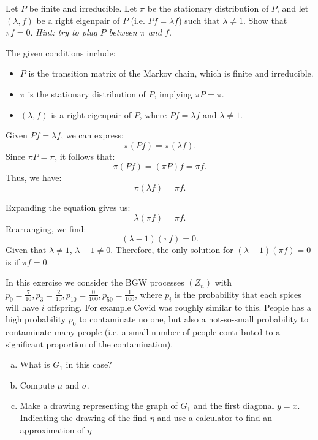 \begin{problem}
	Let $ P $ be finite and irreducible. Let $ \pi $ be the stationary distribution of $ P $, and let $ (\lambda,f) $ be a right eigenpair of $ P $ (i.e. $ Pf = \lambda f $) such that $ \lambda \neq 1 $. Show that $ \pi f= 0 $. \emph{Hint: try to plug $ P $ between $ \pi $ and $ f $.}
\end{problem}

\begin{solution}
	The given conditions include:
	\begin{itemize}
		\item $P$ is the transition matrix of the Markov chain, which is finite and irreducible.
		\item $\pi$ is the stationary distribution of $P$, implying $\pi P = \pi$.
		\item $(\lambda, f)$ is a right eigenpair of $P$, where $Pf = \lambda f$ and $\lambda \neq 1$.
	\end{itemize}
	
	\noindent Given $Pf = \lambda f$, we can express:
	\[
	\pi (Pf) = \pi (\lambda f).
	\]
	Since $\pi P = \pi$, it follows that:
	\[
	\pi (Pf) = (\pi P) f = \pi f.
	\]
	Thus, we have:
	\[
	\pi (\lambda f) = \pi f.
	\]
	
	\noindent Expanding the equation gives us:
	\[
	\lambda (\pi f) = \pi f.
	\]
	Rearranging, we find:
	\[
	(\lambda - 1) (\pi f) = 0.
	\]
	Given that $\lambda \neq 1$, $\lambda - 1 \neq 0$. Therefore, the only solution for $(\lambda - 1) (\pi f) = 0$ is if $\pi f = 0$.
	
\end{solution}


\begin{problem}
	In this exercise we consider the BGW processes $ (Z_n) $ with $ p_0 = \frac{7}{10}, p_3=\frac{2}{10}, p_10=\frac{0}{100},p_50=\frac{1}{100} $, where $ p_i $ is the probability that each spices will have $ i $ offspring. For example Covid was roughly similar to this. People has a high probability $ p_0 $ to contaminate no one, but also a not-so-small probability to contaminate many people (i.e. a small number of people contributed to a significant proportion of the contamination).
	\begin{enumerate}[(a)]
		\item What is $ G_1 $ in this case?
		\item Compute $ \mu $ and $ \sigma $.
		\item Make a drawing representing the graph of $ G_1 $ and the first diagonal $ y=x $. Indicating the drawing of the find $ \eta $ and use a calculator to find an approximation of $ \eta $
	\end{enumerate}
\end{problem}

